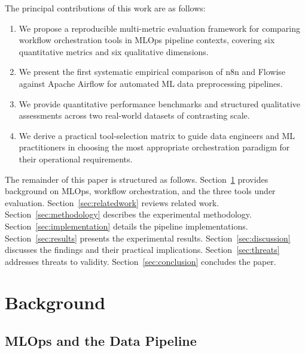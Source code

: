\documentclass[journal]{IEEEtran}
\begin{document}
The principal contributions of this work are as follows:
\begin{enumerate}
  \item We propose a reproducible multi-metric evaluation framework for
        comparing workflow orchestration tools in MLOps pipeline contexts,
        covering six quantitative metrics and six qualitative dimensions.
  \item We present the first systematic empirical comparison of n8n and
        Flowise against Apache Airflow for automated ML data preprocessing
        pipelines.
  \item We provide quantitative performance benchmarks and structured
        qualitative assessments across two real-world datasets of contrasting
        scale.
  \item We derive a practical tool-selection matrix to guide data engineers
        and ML practitioners in choosing the most appropriate orchestration
        paradigm for their operational requirements.
\end{enumerate}

The remainder of this paper is structured as follows.
Section~\ref{sec:background} provides background on MLOps, workflow
orchestration, and the three tools under evaluation.
Section~\ref{sec:relatedwork} reviews related work.
Section~\ref{sec:methodology} describes the experimental methodology.
Section~\ref{sec:implementation} details the pipeline implementations.
Section~\ref{sec:results} presents the experimental results.
Section~\ref{sec:discussion} discusses the findings and their practical
implications. Section~\ref{sec:threats} addresses threats to validity.
Section~\ref{sec:conclusion} concludes the paper.


\section{Background}
\label{sec:background}

\subsection{MLOps and the Data Pipeline}
\end{document}
